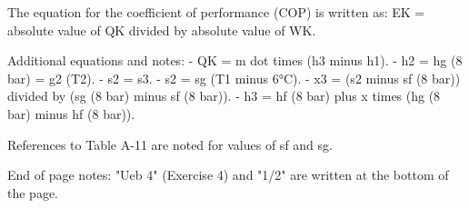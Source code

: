 The equation for the coefficient of performance (COP) is written as:  
EK = absolute value of QK divided by absolute value of WK.  

Additional equations and notes:  
- QK = m dot times (h3 minus h1).  
- h2 = hg (8 bar) = g2 (T2).  
- s2 = s3.  
- s2 = sg (T1 minus 6°C).  
- x3 = (s2 minus sf (8 bar)) divided by (sg (8 bar) minus sf (8 bar)).  
- h3 = hf (8 bar) plus x times (hg (8 bar) minus hf (8 bar)).  

References to Table A-11 are noted for values of sf and sg.  

End of page notes:  
"Ueb 4" (Exercise 4) and "1/2" are written at the bottom of the page.